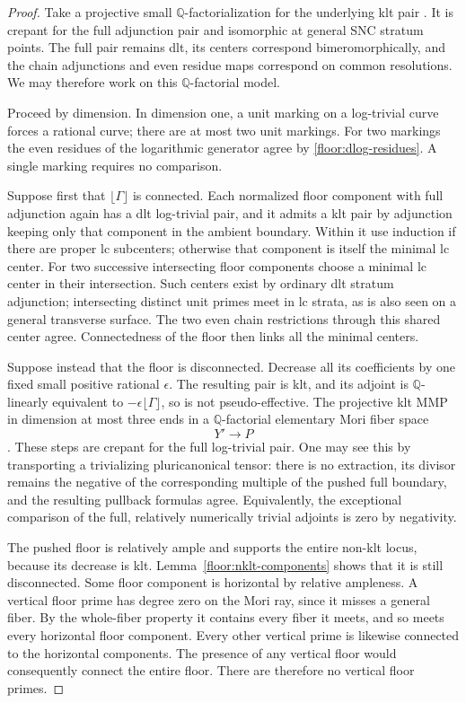 \documentclass[11pt,letterpaper]{article}
\newcommand{\Q}{\mathbb{Q}}
\theoremstyle{definition}
\theoremstyle{remark}
\begin{document}
\begin{proof}
Take a projective small $\Q$-factorialization for the
underlying klt pair \cite{BCHM}.  It is crepant for the full
adjunction pair and isomorphic at general SNC stratum
points.  The full pair remains dlt, its centers correspond
bimeromorphically, and the chain adjunctions and even residue
maps correspond on common resolutions.  We may therefore
work on this $\Q$-factorial model.

Proceed by dimension.  In dimension one, a unit marking on
a log-trivial curve forces a rational curve; there are at
most two unit markings.  For two markings the even residues
of the logarithmic generator agree by
\eqref{floor:dlog-residues}.  A single marking requires no
comparison.

Suppose first that $\lfloor\Gamma\rfloor$ is connected.
Each normalized floor component with full adjunction again
has a dlt log-trivial pair, and it admits a klt pair by
adjunction keeping only that component in the ambient
boundary.  Within it use induction if there are proper
lc subcenters; otherwise that component is itself the
minimal lc center.  For two successive intersecting floor
components choose a minimal lc center in their intersection.
Such centers exist by ordinary dlt stratum adjunction;
intersecting distinct unit primes meet in lc strata, as is
also seen on a general transverse surface.  The two even
chain restrictions through this shared center agree.
Connectedness of the floor then links all the minimal
centers.

Suppose instead that the floor is disconnected.  Decrease
all its coefficients by one fixed small positive rational
$\epsilon$.  The resulting pair is klt, and its adjoint
is $\Q$-linearly equivalent to
$-\epsilon\lfloor\Gamma\rfloor$, so is not
pseudo-effective.  The projective klt MMP in dimension at
most three ends in a $\Q$-factorial elementary Mori fiber
space
\[
 Y'\longrightarrow P
\]
\cite{ThreefoldFlipsAbundance,BCHM}.  These steps are
crepant for the full log-trivial pair.  One may see this
by transporting a trivializing pluricanonical tensor:
there is no extraction, its divisor remains the negative
of the corresponding multiple of the pushed full boundary,
and the resulting pullback formulas agree.  Equivalently,
the exceptional comparison of the full, relatively
numerically trivial adjoints is zero by negativity.

The pushed floor is relatively ample and supports the
entire non-klt locus, because its decrease is klt.
Lemma~\ref{floor:nklt-components} shows that it is still
disconnected.  Some floor component is horizontal by
relative ampleness.  A vertical floor prime has degree
zero on the Mori ray, since it misses a general fiber.
By the whole-fiber property it contains every fiber it
meets, and so meets every horizontal floor component.
Every other vertical prime is likewise connected to the
horizontal components.  The presence of any vertical
floor would consequently connect the entire floor.
There are therefore no vertical floor primes.


\end{proof}
\end{document}
